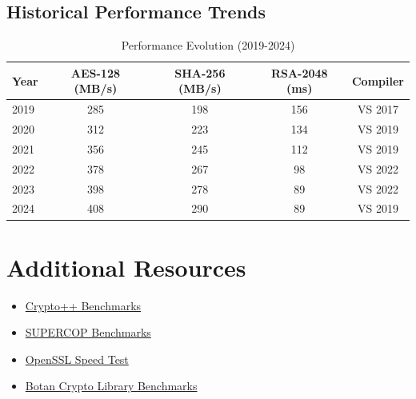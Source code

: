 \documentclass[12pt,a4paper]{article}
\newcommand{\smalltable}[1]{\small #1}
\begin{document}
\subsection{Historical Performance Trends}

\begin{table}[h]
\centering
\smalltable{
\caption{Performance Evolution (2019-2024)}
\begin{tabular}{|l|c|c|c|c|}
\hline
\textbf{Year} & \textbf{AES-128 (MB/s)} & \textbf{SHA-256 (MB/s)} & \textbf{RSA-2048 (ms)} & \textbf{Compiler} \\
\hline
2019 & 285 & 198 & 156 & VS 2017 \\
2020 & 312 & 223 & 134 & VS 2019 \\
2021 & 356 & 245 & 112 & VS 2019 \\
2022 & 378 & 267 & 98 & VS 2022 \\
2023 & 398 & 278 & 89 & VS 2022 \\
2024 & 408 & 290 & 89 & VS 2019 \\
\hline
\end{tabular}
}
\end{table}

\section{Additional Resources}

\begin{itemize}
    \item \href{https://www.cryptopp.com/benchmarks.html}{Crypto++ Benchmarks}
    \item \href{https://bench.cr.yp.to/}{SUPERCOP Benchmarks}
    \item \href{https://www.openssl.org/docs/man1.1.1/man1/speed.html}{OpenSSL Speed Test}
    \item \href{https://github.com/randombit/botan}{Botan Crypto Library Benchmarks}
\end{itemize}
\end{document}
